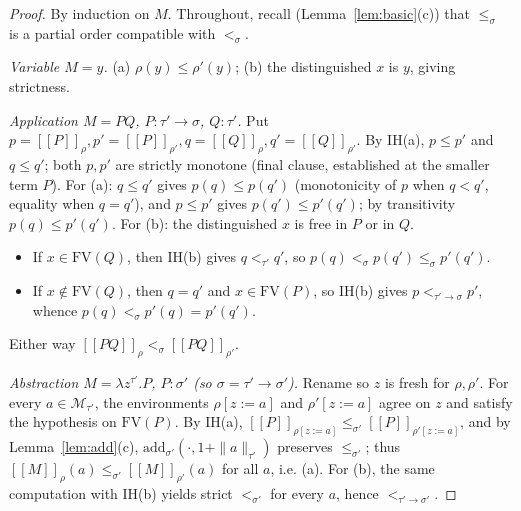 \documentclass{amsart}
\theoremstyle{definition}
\newcommand{\interp}[1]{[\![#1]\!]}
\newcommand{\FV}{\mathrm{FV}}
\begin{document}
\begin{proof}
By induction on $M$. Throughout, recall (Lemma~\ref{lem:basic}(c)) that $\le_\sigma$ is a
partial order compatible with $<_\sigma$.

\emph{Variable $M=y$.} (a) $\rho(y)\le\rho'(y)$; (b) the distinguished $x$ is $y$, giving
strictness.

\emph{Application $M=PQ$, $P:\tau'\to\sigma$, $Q:\tau'$.} Put
$p=\interp{P}_\rho,p'=\interp{P}_{\rho'},q=\interp{Q}_\rho,q'=\interp{Q}_{\rho'}$. By IH(a),
$p\le p'$ and $q\le q'$; both $p,p'$ are strictly monotone (final clause, established at
the smaller term $P$). For (a): $q\le q'$ gives $p(q)\le p(q')$ (monotonicity of $p$ when
$q<q'$, equality when $q=q'$), and $p\le p'$ gives $p(q')\le p'(q')$; by transitivity
$p(q)\le p'(q')$. For (b): the distinguished $x$ is free in $P$ or in $Q$.
\begin{itemize}
\item If $x\in\FV(Q)$, then IH(b) gives $q<_{\tau'}q'$, so $p(q)<_\sigma p(q')\le_\sigma p'(q')$.
\item If $x\notin\FV(Q)$, then $q=q'$ and $x\in\FV(P)$, so IH(b) gives $p<_{\tau'\to\sigma}p'$,
  whence $p(q)<_\sigma p'(q)=p'(q')$.
\end{itemize}
Either way $\interp{PQ}_\rho<_\sigma\interp{PQ}_{\rho'}$.

\emph{Abstraction $M=\lambda z^{\tau'}.P$, $P:\sigma'$ (so $\sigma=\tau'\to\sigma'$).}
Rename so $z$ is fresh for $\rho,\rho'$. For every $a\in\mathcal M_{\tau'}$, the
environments $\rho[z:=a]$ and $\rho'[z:=a]$ agree on $z$ and satisfy the hypothesis on
$\FV(P)$. By IH(a), $\interp{P}_{\rho[z:=a]}\le_{\sigma'}\interp{P}_{\rho'[z:=a]}$, and by
Lemma~\ref{lem:add}(c), $\mathrm{add}_{\sigma'}(\cdot,1+\|a\|_{\tau'})$ preserves
$\le_{\sigma'}$; thus $\interp{M}_\rho(a)\le_{\sigma'}\interp{M}_{\rho'}(a)$ for all $a$,
i.e. (a). For (b), the same computation with IH(b) yields strict $<_{\sigma'}$ for every
$a$, hence $<_{\tau'\to\sigma'}$.


\end{proof}
\end{document}
